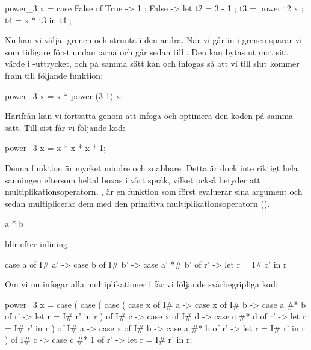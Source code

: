 \documentclass[../Optimise]{subfiles}
\begin{document}
\begin{codeEx}
power_3 x = case False of
    { True -> 1
    ; False -> let 
        { t2 = 3 - 1 
        ; t3 = power t2 x
        ; t4 = x * t3
        } in t4
    };
\end{codeEx}

Nu kan vi välja -grenen och strunta i den andra. När vi går in i grenen
sparar vi som tidigare först undan :arna och går sedan till .
Den kan bytas ut mot sitt värde i -uttrycket, och på samma sätt  kan 
och  infogas så att vi till slut kommer fram till följande funktion:

\begin{codeEx}
power_3 x = x * power (3-1) x;
\end{codeEx}

Härifrån kan vi fortsätta genom att infoga  och optimera den
koden på samma sätt. Till sist får vi följande kod:

\begin{codeEx}
power_3 x = x * x * x * 1;
\end{codeEx}

Denna funktion är mycket mindre och snabbare.
Detta är dock inte riktigt hela sanningen eftersom heltal boxas i vårt språk, vilket
också betyder att multiplikationsoperatorn, \ic{*}, är en funktion som först
evaluerar sina argument och sedan multiplicerar dem med den primitiva 
multiplikationsoperatorn (\ic{*\#}).

\begin{codeEx}
a * b
\end{codeEx}

blir efter inlining

\begin{codeEx}
case a of
    { I# a' -> case b of
        { I# b' -> case  a' *# b' of
            { r' -> let r = I# r' in r}}}
\end{codeEx}

Om vi nu infogar alla multiplikationer i  får vi följande svårbegripliga kod:
\begin{codeEx}
power_3 x = case 
    ( case 
        ( case 
            ( case x of
                { I# a -> case x of
                    { I# b -> case a #* b of
                        { r' -> let r = I# r' in r}}}
            ) of
            { I# c -> case x of
                { I# d -> case c #* d of
                    { r' -> let r = I# r' in r}}}                
         ) of
         { I# a -> case x of
              { I# b -> case a #* b of
                   { r' -> let r = I# r' in r}}}
    ) of
        { I# c -> case c #* 1 of
            { r' -> let r = I# r' in r}};                                     
\end{codeEx}
\end{document}
